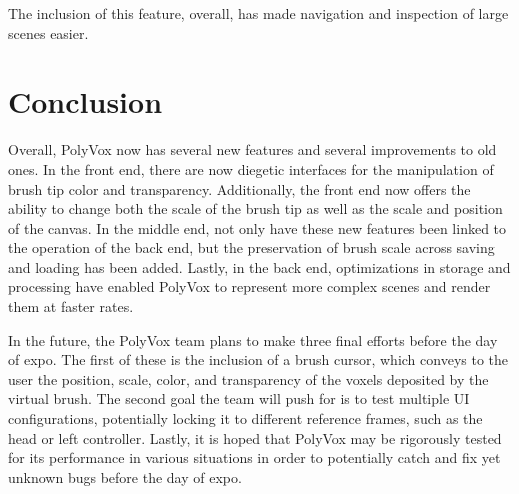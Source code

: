 \documentclass[onecolumn, draftclsnofoot,10pt, compsoc]{IEEEtran}
\begin{document}
The inclusion of this feature, overall, has made navigation and inspection of large scenes easier.

\section{Conclusion}

Overall, PolyVox now has several new features and several improvements to old ones. In the front end, there are now diegetic interfaces for the manipulation of brush tip color and transparency. Additionally, the front end now offers the ability to change both the scale of the brush tip as well as the scale and position of the canvas. In the middle end, not only have these new features been linked to the operation of the back end, but the preservation of brush scale across saving and loading has been added. Lastly, in the back end, optimizations in storage and processing have enabled PolyVox to represent more complex scenes and render them at faster rates.

In the future, the PolyVox team plans to make three final efforts before the day of expo. The first of these is the inclusion of a brush cursor, which conveys to the user the position, scale, color, and transparency of the voxels deposited by the virtual brush. The second goal the team will push for is to test multiple UI configurations, potentially locking it to different reference frames, such as the head or left controller. Lastly, it is hoped that PolyVox may be rigorously tested for its performance in various situations in order to potentially catch and fix yet unknown bugs before the day of expo.
\end{document}

